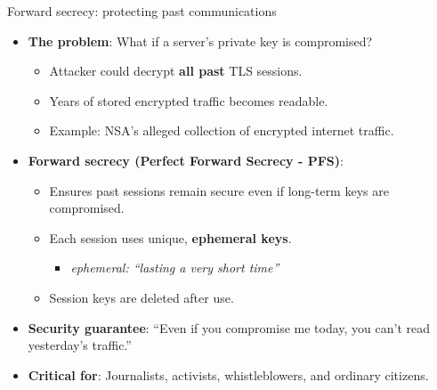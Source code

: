 \ifdefined\PRESENTATION\else\PassOptionsToClass{handout}{beamer}\fi\documentclass[aspectratio=169, lualatex]{beamer}
\begin{document}
\begin{frame}{Forward secrecy: protecting past communications}
	\begin{itemize}[<+->]
		\item \textbf{The problem}: What if a server's private key is compromised?
		      \begin{itemize}
			      \item Attacker could decrypt \textbf{all past} TLS sessions.
			      \item Years of stored encrypted traffic becomes readable.
			      \item Example: NSA's alleged collection of encrypted internet traffic.
		      \end{itemize}
		\item \textbf{Forward secrecy (Perfect Forward Secrecy - PFS)}:
		      \begin{itemize}
			      \item Ensures past sessions remain secure even if long-term keys are compromised.
			      \item Each session uses unique, \textbf{ephemeral keys}.
			            \begin{itemize}
				            \item \textit{ephemeral: ``lasting a very short time''}
			            \end{itemize}
			      \item Session keys are deleted after use.
		      \end{itemize}
		\item \textbf{Security guarantee}: ``Even if you compromise me today, you can't read yesterday's traffic.''
		\item \textbf{Critical for}: Journalists, activists, whistleblowers, and ordinary citizens.
	\end{itemize}
\end{frame}
\end{document}
